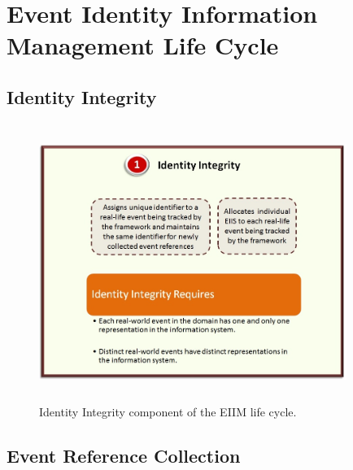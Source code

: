

\chapter{Event Identity Information Management Life Cycle} %

\label{eiim} %


\section{Identity Integrity}

\begin{figure}[htbp]
  \caption{Identity Integrity component of the EIIM life cycle.}
  \centering
    \includegraphics[width=10cm,height=9cm]{Figures/EIIMComponents/IdentityIntegrity.jpg}
\end{figure}

\section{Event Reference Collection}

